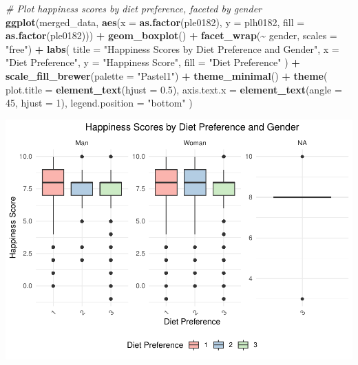 \documentclass[
]{article}
\newenvironment{Shaded}{\begin{snugshade}}{\end{snugshade}}
\newcommand{\AttributeTok}[1]{\textcolor[rgb]{0.13,0.29,0.53}{#1}}
\newcommand{\CommentTok}[1]{\textcolor[rgb]{0.56,0.35,0.01}{\textit{#1}}}
\newcommand{\DecValTok}[1]{\textcolor[rgb]{0.00,0.00,0.81}{#1}}
\newcommand{\FloatTok}[1]{\textcolor[rgb]{0.00,0.00,0.81}{#1}}
\newcommand{\FunctionTok}[1]{\textcolor[rgb]{0.13,0.29,0.53}{\textbf{#1}}}
\newcommand{\NormalTok}[1]{#1}
\newcommand{\SpecialCharTok}[1]{\textcolor[rgb]{0.81,0.36,0.00}{\textbf{#1}}}
\newcommand{\StringTok}[1]{\textcolor[rgb]{0.31,0.60,0.02}{#1}}
\begin{document}
\begin{Shaded}
\begin{Highlighting}[]
\CommentTok{\# Plot happiness scores by diet preference, faceted by gender}
\FunctionTok{ggplot}\NormalTok{(merged\_data, }\FunctionTok{aes}\NormalTok{(}\AttributeTok{x =} \FunctionTok{as.factor}\NormalTok{(ple0182), }\AttributeTok{y =}\NormalTok{ plh0182, }\AttributeTok{fill =} \FunctionTok{as.factor}\NormalTok{(ple0182))) }\SpecialCharTok{+}
  \FunctionTok{geom\_boxplot}\NormalTok{() }\SpecialCharTok{+}
  \FunctionTok{facet\_wrap}\NormalTok{(}\SpecialCharTok{\textasciitilde{}}\NormalTok{ gender, }\AttributeTok{scales =} \StringTok{"free"}\NormalTok{) }\SpecialCharTok{+}
  \FunctionTok{labs}\NormalTok{(}
    \AttributeTok{title =} \StringTok{"Happiness Scores by Diet Preference and Gender"}\NormalTok{,}
    \AttributeTok{x =} \StringTok{"Diet Preference"}\NormalTok{,}
    \AttributeTok{y =} \StringTok{"Happiness Score"}\NormalTok{,}
    \AttributeTok{fill =} \StringTok{"Diet Preference"}
\NormalTok{  ) }\SpecialCharTok{+}
  \FunctionTok{scale\_fill\_brewer}\NormalTok{(}\AttributeTok{palette =} \StringTok{"Pastel1"}\NormalTok{) }\SpecialCharTok{+}
  \FunctionTok{theme\_minimal}\NormalTok{() }\SpecialCharTok{+}
  \FunctionTok{theme}\NormalTok{(}
    \AttributeTok{plot.title =} \FunctionTok{element\_text}\NormalTok{(}\AttributeTok{hjust =} \FloatTok{0.5}\NormalTok{),}
    \AttributeTok{axis.text.x =} \FunctionTok{element\_text}\NormalTok{(}\AttributeTok{angle =} \DecValTok{45}\NormalTok{, }\AttributeTok{hjust =} \DecValTok{1}\NormalTok{),}
    \AttributeTok{legend.position =} \StringTok{"bottom"}
\NormalTok{  )}
\end{Highlighting}
\end{Shaded}

\includegraphics{Final-v2_files/figure-latex/Gender~analysis-1.pdf}
\end{document}
